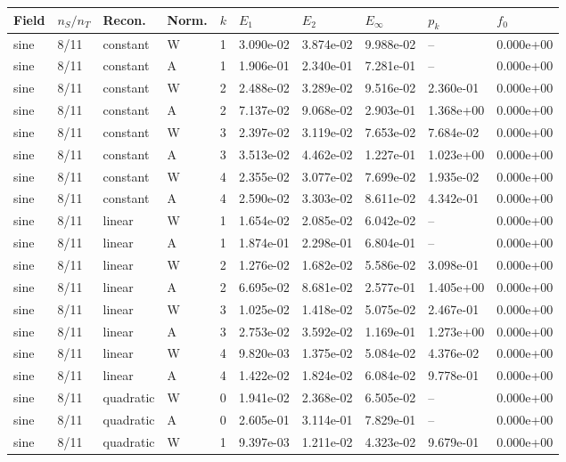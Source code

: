 \begin{tabular}{llllllllll}
\toprule
Field & $n_S/n_T$ & Recon. & Norm. & $k$ & $E_1$ & $E_2$ & $E_\infty$ & $p_k$ & $f_0$ \\
\midrule
sine & 8/11 & constant & W & 1 & 3.090e-02 & 3.874e-02 & 9.988e-02 & -- & 0.000e+00 \\
sine & 8/11 & constant & A & 1 & 1.906e-01 & 2.340e-01 & 7.281e-01 & -- & 0.000e+00 \\
sine & 8/11 & constant & W & 2 & 2.488e-02 & 3.289e-02 & 9.516e-02 & 2.360e-01 & 0.000e+00 \\
sine & 8/11 & constant & A & 2 & 7.137e-02 & 9.068e-02 & 2.903e-01 & 1.368e+00 & 0.000e+00 \\
sine & 8/11 & constant & W & 3 & 2.397e-02 & 3.119e-02 & 7.653e-02 & 7.684e-02 & 0.000e+00 \\
sine & 8/11 & constant & A & 3 & 3.513e-02 & 4.462e-02 & 1.227e-01 & 1.023e+00 & 0.000e+00 \\
sine & 8/11 & constant & W & 4 & 2.355e-02 & 3.077e-02 & 7.699e-02 & 1.935e-02 & 0.000e+00 \\
sine & 8/11 & constant & A & 4 & 2.590e-02 & 3.303e-02 & 8.611e-02 & 4.342e-01 & 0.000e+00 \\
sine & 8/11 & linear & W & 1 & 1.654e-02 & 2.085e-02 & 6.042e-02 & -- & 0.000e+00 \\
sine & 8/11 & linear & A & 1 & 1.874e-01 & 2.298e-01 & 6.804e-01 & -- & 0.000e+00 \\
sine & 8/11 & linear & W & 2 & 1.276e-02 & 1.682e-02 & 5.586e-02 & 3.098e-01 & 0.000e+00 \\
sine & 8/11 & linear & A & 2 & 6.695e-02 & 8.681e-02 & 2.577e-01 & 1.405e+00 & 0.000e+00 \\
sine & 8/11 & linear & W & 3 & 1.025e-02 & 1.418e-02 & 5.075e-02 & 2.467e-01 & 0.000e+00 \\
sine & 8/11 & linear & A & 3 & 2.753e-02 & 3.592e-02 & 1.169e-01 & 1.273e+00 & 0.000e+00 \\
sine & 8/11 & linear & W & 4 & 9.820e-03 & 1.375e-02 & 5.084e-02 & 4.376e-02 & 0.000e+00 \\
sine & 8/11 & linear & A & 4 & 1.422e-02 & 1.824e-02 & 6.084e-02 & 9.778e-01 & 0.000e+00 \\
sine & 8/11 & quadratic & W & 0 & 1.941e-02 & 2.368e-02 & 6.505e-02 & -- & 0.000e+00 \\
sine & 8/11 & quadratic & A & 0 & 2.605e-01 & 3.114e-01 & 7.829e-01 & -- & 0.000e+00 \\
sine & 8/11 & quadratic & W & 1 & 9.397e-03 & 1.211e-02 & 4.323e-02 & 9.679e-01 & 0.000e+00 \\

\end{tabular}
